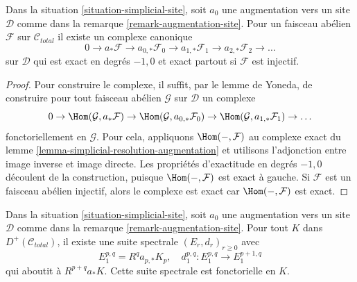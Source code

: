 \begin{lemma}
\label{lemma-augmentation-cech-complex}
Dans la situation \ref{situation-simplicial-site}, soit
$a_0$ une augmentation vers un site $\mathcal{D}$
comme dans la remarque \ref{remark-augmentation-site}.
Pour un faisceau abélien $\mathcal{F}$ sur $\mathcal{C}_{total}$
il existe un complexe canonique
$$
0 \to a_*\mathcal{F} \to a_{0, *}\mathcal{F}_0 \to a_{1, *}\mathcal{F}_1 \to
a_{2, *}\mathcal{F}_2 \to \ldots
$$
sur $\mathcal{D}$ qui est exact en degrés $-1, 0$ et
exact partout si $\mathcal{F}$ est injectif.
\end{lemma}

\begin{proof}
Pour construire le complexe, il suffit, par le lemme de Yoneda, de construire pour tout
faisceau abélien $\mathcal{G}$ sur $\mathcal{D}$ un complexe
$$
0 \to \Hom(\mathcal{G}, a_*\mathcal{F}) \to
\Hom(\mathcal{G}, a_{0, *}\mathcal{F}_0) \to
\Hom(\mathcal{G}, a_{1, *}\mathcal{F}_1) \to \ldots
$$
fonctoriellement en $\mathcal{G}$. Pour cela, appliquons $\Hom(-, \mathcal{F})$
au complexe exact du lemme \ref{lemma-simplicial-resolution-augmentation}
et utilisons l'adjonction entre image inverse et image directe.
Les propriétés d'exactitude en degrés $-1, 0$ découlent de
la construction, puisque $\Hom(-, \mathcal{F})$ est exact à gauche.
Si $\mathcal{F}$ est un faisceau abélien injectif, alors le complexe
est exact car $\Hom(-, \mathcal{F})$ est exact.
\end{proof}

\begin{lemma}
\label{lemma-augmentation-spectral-sequence}
Dans la situation \ref{situation-simplicial-site}, soit
$a_0$ une augmentation vers un site $\mathcal{D}$
comme dans la remarque \ref{remark-augmentation-site}.
Pour tout $K$ dans $D^+(\mathcal{C}_{total})$, il existe une suite
spectrale
$(E_r, d_r)_{r \geq 0}$ avec
$$
E_1^{p, q} = R^qa_{p, *} K_p,\quad
d_1^{p, q} : E_1^{p, q} \to E_1^{p + 1, q}
$$
qui aboutit à $R^{p + q}a_*K$. Cette suite spectrale est fonctorielle en $K$.
\end{lemma}

